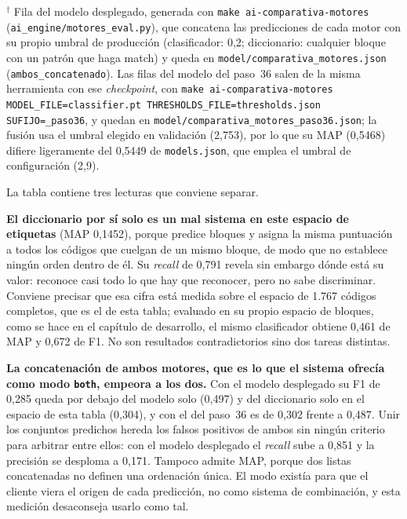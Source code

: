 \begin{table}[h]
\vspace{2mm}
{\footnotesize $^{\dagger}$ Fila del modelo desplegado, generada con \texttt{make ai-comparativa-motores} (\texttt{ai\_engine/motores\_eval.py}), que concatena las predicciones de cada motor con su propio umbral de producción (clasificador: 0,2; diccionario: cualquier bloque con un patrón que haga match) y queda en \texttt{model/comparativa\_motores.json} (\texttt{ambos\_concatenado}). Las filas del modelo del paso~36 salen de la misma herramienta con ese \emph{checkpoint}, con \texttt{make ai-comparativa-motores MODEL\_FILE=classifier.pt THRESHOLDS\_FILE=thresholds.json SUFIJO=\_paso36}, y quedan en \texttt{model/\allowbreak comparativa\_motores\_paso36.json}; la fusión usa el umbral elegido en validación (2,753), por lo que su MAP (0,5468) difiere ligeramente del 0,5449 de \texttt{models.json}, que emplea el umbral de configuración (2,9).}
\end{table}

La tabla contiene tres lecturas que conviene separar.

\textbf{El diccionario por sí solo es un mal sistema en este espacio de etiquetas} (MAP 0{,}1452), porque predice bloques y asigna la misma puntuación a todos los códigos que cuelgan de un mismo bloque, de modo que no establece ningún orden dentro de él. Su \emph{recall} de 0{,}791 revela sin embargo dónde está su valor: reconoce casi todo lo que hay que reconocer, pero no sabe discriminar. Conviene precisar que esa cifra está medida sobre el espacio de 1.767 códigos completos, que es el de esta tabla; evaluado en su propio espacio de bloques, como se hace en el capítulo de desarrollo, el mismo clasificador obtiene 0{,}461 de MAP y 0{,}672 de F1. No son resultados contradictorios sino dos tareas distintas.

\textbf{La concatenación de ambos motores, que es lo que el sistema ofrecía como modo \texttt{both}, empeora a los dos.} Con el modelo desplegado su F1 de 0{,}285 queda por debajo del modelo solo (0{,}497) y del diccionario solo en el espacio de esta tabla (0{,}304), y con el del paso~36 es de 0{,}302 frente a 0{,}487. Unir los conjuntos predichos hereda los falsos positivos de ambos sin ningún criterio para arbitrar entre ellos: con el modelo desplegado el \emph{recall} sube a 0{,}851 y la precisión se desploma a 0{,}171. Tampoco admite MAP, porque dos listas concatenadas no definen una ordenación única. El modo existía para que el cliente viera el origen de cada predicción, no como sistema de combinación, y esta medición desaconseja usarlo como tal.

